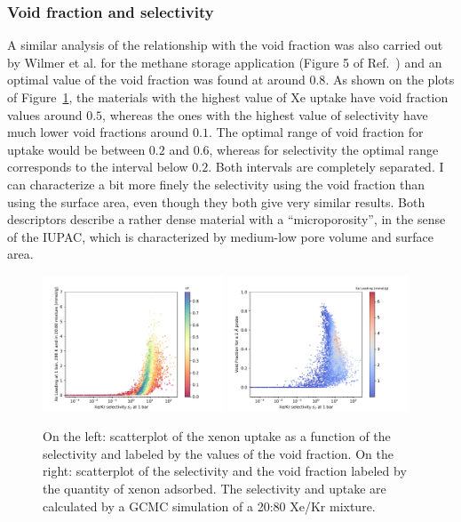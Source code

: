 \documentclass[main.tex]{subfiles}
\begin{document}
\subsubsection{Void fraction and selectivity}

A similar analysis of the relationship with the void fraction was also carried out by Wilmer et al. for the methane storage application (Figure 5 of Ref.~\cite{Wilmer_2012}) and an optimal value of the void fraction was found at around $0.8$. As shown on the plots of Figure~\ref{fgr:vol}, the materials with the highest value of Xe uptake have void fraction values around $0.5$, whereas the ones with the highest value of selectivity have much lower void fractions around $0.1$. The optimal range of void fraction for uptake would be between $0.2$ and $0.6$, whereas for selectivity the optimal range corresponds to the interval below $0.2$. Both intervals are completely separated. I can characterize a bit more finely the selectivity using the void fraction than using the surface area, even though they both give very similar results. Both descriptors describe a rather dense material with a ``microporosity'', in the sense of the IUPAC\autocite{Sing_1985}, which is characterized by medium-low pore volume and surface area.

\begin{figure}[ht]
  \centering
  \includegraphics[width=0.48\textwidth]{figures/2-thermo/Scatterplot_uptake_selectivity_vol.pdf}
  \includegraphics[width=0.48\textwidth]{figures/2-thermo/Scatterplot_vol_selectivity.pdf}
  \caption{On the left: scatterplot of the xenon uptake as a function of the selectivity and labeled by the values of the void fraction. On the right: scatterplot of the selectivity and the void fraction labeled by the quantity of xenon adsorbed. The selectivity and uptake are calculated by a GCMC simulation of a 20:80 Xe/Kr mixture.}\label{fgr:vol}
\end{figure}
\end{document}
